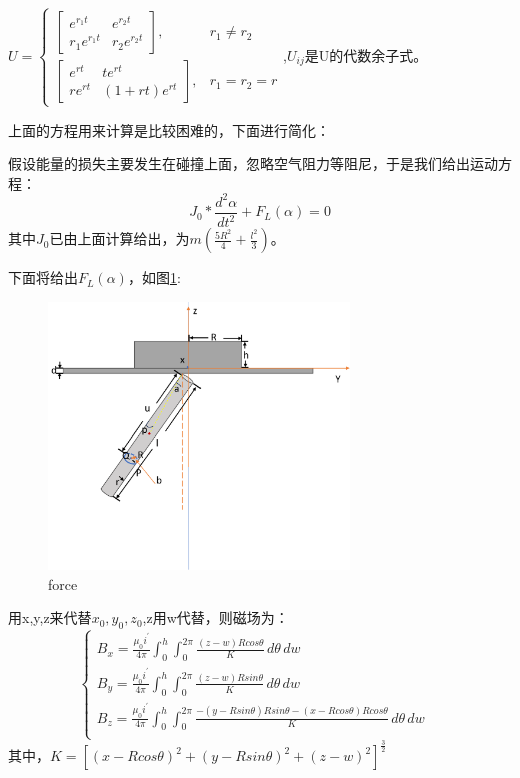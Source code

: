 \documentclass[AutoFakeBold]{LZUThesis}
\begin{document}
$U = \left \{
\begin{array}{lr}
\left[
\begin{matrix}
    e^{r_1t} &e^{r_2t} \\
    r_1e^{r_1t} &r_2e^{r_2t}
\end{matrix} \right], &r_1\neq r_2 \\


\left[
\begin{matrix}
    e^{rt} &te^{rt} \\
    re^{rt} &(1+rt)e^{rt}
\end{matrix}\right], &r_1 = r_2 = r
\end{array}
\right.$,$U_{ij}$是U的代数余子式。

上面的方程用来计算是比较困难的，下面进行简化：

假设能量的损失主要发生在碰撞上面，忽略空气阻力等阻尼，于是我们给出运动方程：
\begin{equation}
    J_{0}*\frac{d^{2}\alpha}{dt^{2}} + F_{L}(\alpha) = 0
\end{equation}
其中$J_{0}$已由上面计算给出，为$m(\frac{5R^2}{4} + \frac{l^2}{3})$。

下面将给出$F_{L}(\alpha)$，如图\ref{force}:
\begin{figure}[H]
    \centering
    \includegraphics[width=8cm]{figures/force.png}
    \caption{force}
    \label{force}
\end{figure}

用x,y,z来代替$x_{0},y_{0},z_{0}$,z用w代替，则磁场为：
\begin{equation}
    \left \{
    \begin{array}{lr}
    B_x = \frac{\mu_0i^{'}}{4\pi} \int_{0}^{h}\int_{0}^{2\pi} \frac{(z - w)Rcos\theta}{K} \,d\theta\,dw & \\
    B_y = \frac{\mu_0i^{'}}{4\pi} \int_{0}^{h}\int_{0}^{2\pi} \frac{(z - w)Rsin\theta}{K} \,d\theta\,dw & \\
    B_z = \frac{\mu_0i^{'}}{4\pi} \int_{0}^{h}\int_{0}^{2\pi} \frac{-(y - Rsin\theta)Rsin\theta -(x - Rcos\theta)Rcos\theta}{K} \,d\theta\,dw & \\
    \end{array}
    \right.
\end{equation}
其中，$K = [(x - Rcos\theta)^2 + (y -Rsin\theta)^2 + (z - w)^2]^\frac{3}{2}$
\end{document}
